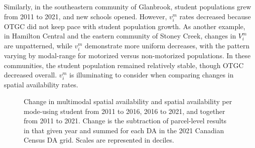 \documentclass[
default
]{sn-jnl}
\begin{document}
Similarly, in the southeastern community of Glanbrook, student
populations grew from 2011 to 2021, and new schools opened. However,
\(v_i^m\) rates decreased because OTGC did not keep pace with student
population growth. As another example, in Hamilton Central and the
eastern community of Stoney Creek, changes in \(V_i^m\) are unpatterned,
while \(v_i^m\) demonstrate more uniform decreases, with the pattern
varying by modal-range for motorized versus non-motorized populations.
In these communities, the student population remained relatively stable,
though OTGC decreased overall. \(v_i^m\) is illuminating to consider
when comparing changes in spatial availability rates.

\begin{figure}[H]


\caption{\label{fig-Fig8}Change in multimodal spatial availability and
spatial availability per mode-using student from 2011 to 2016, 2016 to
2021, and together from 2011 to 2021. Change is the subtraction of
parcel-level results in that given year and summed for each DA in the
2021 Canadian Census DA grid. Scales are represented in deciles.}

\end{figure}%
\end{document}
